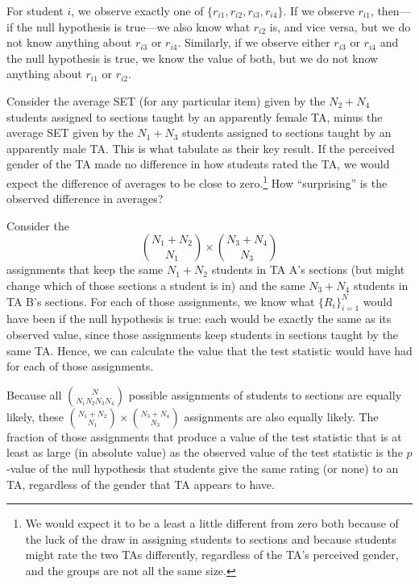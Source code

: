 \documentclass[12pt]{article}
\newcommand{\beq}{\begin{equation}}
\newcommand{\eeq}{\end{equation}}
\begin{document}
For student $i$, we observe exactly one of $\{r_{i1}, r_{i2}, r_{i3}, r_{i4}\}$.
If we observe $r_{i1}$, then---if the null hypothesis is true---we also know what $r_{i2}$ is,
and vice versa, but we do not know anything about $r_{i3}$ or $r_{i4}$.
Similarly, if we observe either $r_{i3}$ or $r_{i4}$ and the null hypothesis is true,
we know the value of both, but we do not know anything about $r_{i1}$ or $r_{i2}$.

Consider the average SET (for any particular item)
given by the $N_2 + N_4$ students
assigned to sections taught by an apparently female TA, minus the 
average SET given by the $N_1 + N_3$ students
assigned to sections taught by an apparently male TA.
This is what \cite{MacNell2014} tabulate as their key result.
If the perceived gender of the TA made no difference in how students rated 
the TA, we would expect the difference of averages to be close to
zero.\footnote{%
We would expect it to be a least a little different from zero both because of the luck of the draw
in assigning students to sections and because students might rate the two TAs
differently, regardless of the TA's perceived gender, and the groups are not all the same size.
}
How ``surprising'' is the observed difference in averages?

Consider the
\beq
{{N_1 + N_2} \choose {N_1}} \times {{N_3+N_4} \choose {N_3}}
\eeq
assignments that keep the same $N_1 + N_2$ students in TA A's
sections (but might change which of those sections a student is in) 
and the same $N_3 + N_4$ students in TA B's sections.
For each of those assignments, we know what $\{R_i\}_{i=1}^N$ would
have been if the null hypothesis is true: each would be exactly the same
as its observed value, since those
assignments keep students in sections taught by the same TA.
Hence, we can calculate the value that the test statistic would have had for each
of those assignments.

Because all ${N}\choose{N_1 N_2 N_3 N_4}$ possible assignments of students
to sections are equally likely, these 
${{N_1 + N_2} \choose {N_1}} \times {{N_3+N_4} \choose {N_3}}$ 
assignments are also equally likely.
The fraction of those assignments that produce a value of the test statistic that
is at least as large (in absolute value) as the observed value of the test statistic
is the $p$-value of the null hypothesis that students give the same rating (or none) to
an TA, regardless of the gender that TA appears to have.
\end{document}
